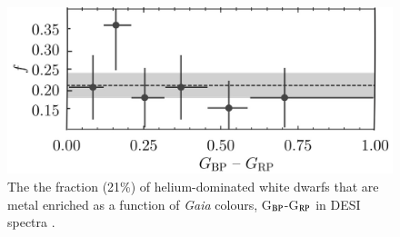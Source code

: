 \documentclass[onecolumn,authoryear]{els-mrw}
\begin{document}
\begin{figure}[t]
\centering
\includegraphics[angle=0, width=.8\textwidth]{Manser_freq_enriched_bottom.jpg}
\caption{ The  the fraction (21\%) of helium-dominated white dwarfs that are metal enriched as a function of {\it Gaia} colours, G$_{\rm BP}$-G$_{\rm RP}$ in DESI spectra \citep{Manser2024b}. }
\label{fig:manser}
\end{figure}
\end{document}
